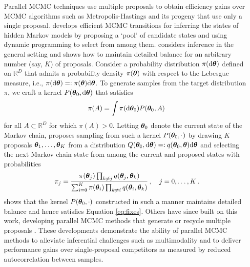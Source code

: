 \documentclass[12pt]{article} %
\begin{document}
Parallel MCMC techniques use multiple proposals to obtain efficiency gains over MCMC algorithms such as Metropolis-Hastings \citep{metropolis1953equation,hastings1970monte} and its progeny that use only a single proposal.  \citet{neal2003markov} develops efficient MCMC transitions for inferring the states of hidden Markov models by proposing a `pool' of candidate states and using dynamic programming to select from among them.  \citet{tjelmeland2004using} considers inference in the general setting and shows how to maintain detailed balance for an arbitrary number (say, $K$) of proposals.  Consider a probability distribution $\pi(\mbox{d}\boldsymbol{\theta})$ defined on $\mathbb{R}^D$ that admits a probability density $\pi(\boldsymbol{\theta})$ with respect to the Lebesgue measure, i.e., $\pi(\mbox{d} \boldsymbol{\theta})=:\pi(\boldsymbol{\theta})\mbox{d}\boldsymbol{\theta}$. To generate samples from the target distribution $\pi$, we craft a kernel $P(\boldsymbol{\theta}_0,\mbox{d} \boldsymbol{\theta})$ that satisfies
\begin{align}\label{eq:fixes}
\pi(A) = \int \pi(\mbox{d} \boldsymbol{\theta}_0) P(\boldsymbol{\theta}_0,A) \, 
\end{align} 
for all  $A \subset \mathbb{R}^D$ for which $\pi(A) > 0$.  Letting $\boldsymbol{\theta}_0$ denote the current state of the Markov chain, \citet{tjelmeland2004using} proposes sampling from such a kernel $P(\boldsymbol{\theta}_0,\cdot)$ by drawing $K$ proposals $\boldsymbol{\theta}_1,\dots,\boldsymbol{\theta}_K$ from a distribution $Q(\boldsymbol{\theta}_0,\mbox{d} \boldsymbol{\theta}) =: q(\boldsymbol{\theta}_0,\boldsymbol{\theta})\mbox{d} \boldsymbol{\theta}$ and selecting the next Markov chain state from among the current and proposed states with probabilities
\begin{align}\label{eq:probs}
\pi_j = \frac{\pi(\boldsymbol{\theta}_j) \prod_{k \neq j} q(\boldsymbol{\theta}_j,\boldsymbol{\theta}_k)}{\sum_{i=0}^K \pi(\boldsymbol{\theta}_i) \prod_{k \neq i} q(\boldsymbol{\theta}_i,\boldsymbol{\theta}_k)} \, , \quad j=0,\dots,K \, .
\end{align}
\citet{tjelmeland2004using} shows that the kernel $P(\boldsymbol{\theta}_0,\cdot)$ constructed in such a manner maintains detailed balance and hence satisfies Equation \eqref{eq:fixes}.  Others have since built on this work, developing parallel MCMC methods that generate or recycle multiple proposals \citep{frenkel2004speed,delmas2009does,calderhead2014general,yang2018parallelizable,luo2019multiple,schwedes2021rao,holbrook2021generating}.  
These developments demonstrate the ability of parallel MCMC methods to alleviate inferential challenges such as multimodality and to deliver performance gains over single-proposal competitors as measured by reduced autocorrelation between samples.
\end{document}
